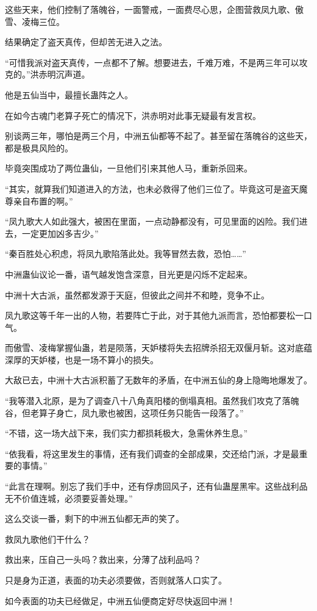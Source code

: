 \begin{this_body}
这些天来，他们控制了落魄谷，一面警戒，一面费尽心思，企图营救凤九歌、傲雪、凌梅三位。

结果确定了盗天真传，但却苦无进入之法。

“可惜我派对盗天真传，一点都不了解。想要进去，千难万难，不是两三年可以攻克的。”洪赤明沉声道。

他是五仙当中，最擅长蛊阵之人。

在如今古魂门老算子死亡的情况下，洪赤明对此事无疑最有发言权。

别谈两三年，哪怕是两三个月，中洲五仙都等不起了。甚至留在落魄谷的这些天，都是极具风险的。

毕竟突围成功了两位蛊仙，一旦他们引来其他人马，重新杀回来。

“其实，就算我们知道进入的方法，也未必救得了他们三位了。毕竟这可是盗天魔尊亲自布置的啊。”

“凤九歌大人如此强大，被困在里面，一点动静都没有，可见里面的凶险。我们进去，一定更加凶多吉少。”

“秦百胜处心积虑，将凤九歌陷落此处。我等冒然去救，恐怕……”

中洲蛊仙议论一番，语气越发饱含深意，目光更是闪烁不定起来。

中洲十大古派，虽然都发源于天庭，但彼此之间并不和睦，竞争不止。

凤九歌这等千年一出的人物，若要阵亡于此，对于其他九派而言，恐怕都要松一口气。

而傲雪、凌梅掌握仙蛊，若是陨落，天妒楼将失去招牌杀招无双偃月斩。这对底蕴深厚的天妒楼，也是一场不算小的损失。

大敌已去，中洲十大古派积蓄了无数年的矛盾，在中洲五仙的身上隐晦地爆发了。

“我等潜入北原，是为了调查八十八角真阳楼的倒塌真相。虽然我们攻克了落魄谷，但老算子身亡，凤九歌也被困，这项任务只能告一段落了。”

“不错，这一场大战下来，我们实力都损耗极大，急需休养生息。”

“依我看，将这里发生的事情，还有我们调查的全部成果，交还给门派，才是最重要的事情。”

“此言在理啊。别忘了我们手中，还有俘虏回风子，还有仙蛊屋黑牢。这些战利品无不价值连城，必须要妥善处理。”

这么交谈一番，剩下的中洲五仙都无声的笑了。

救凤九歌他们干什么？

救出来，压自己一头吗？救出来，分薄了战利品吗？

只是身为正道，表面的功夫必须要做，否则就落人口实了。

如今表面的功夫已经做足，中洲五仙便商定好尽快返回中洲！

\end{this_body}

